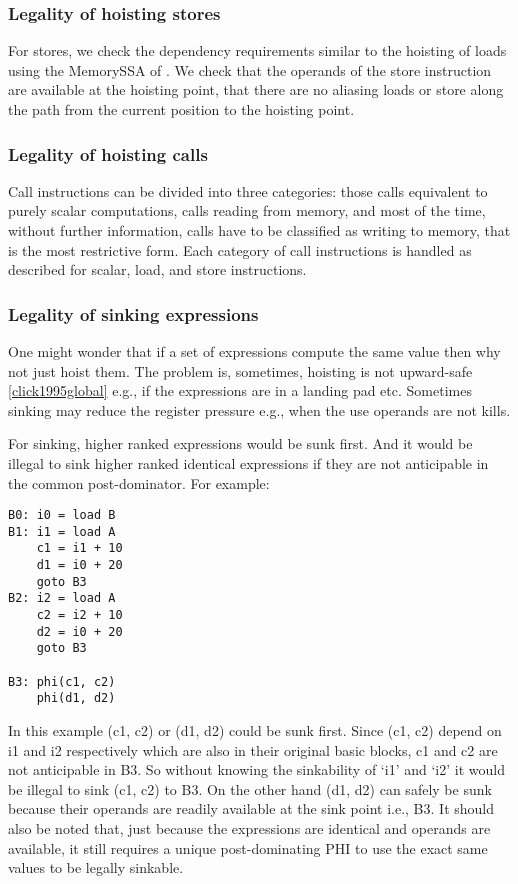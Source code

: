 \documentclass[acmlarge,review]{acmart}\settopmatter{printfolios=true}
\begin{document}
\subsubsection{Legality of hoisting stores}
For stores, we check the dependency requirements similar to the hoisting of
loads using the MemorySSA of \LLVM{}. We check that the operands of the store
instruction are available at the hoisting point, that there are no aliasing
loads or store along the path from the current position to the hoisting point.

\subsubsection{Legality of hoisting calls}
Call instructions can be divided into three categories: those calls equivalent
to purely scalar computations, calls reading from memory, and most of the time,
without further information, calls have to be classified as writing to memory,
that is the most restrictive form.  Each category of call instructions is
handled as described for scalar, load, and store instructions.

\subsubsection{Legality of sinking expressions}
One might wonder that if a set of expressions compute the same value then why
not just hoist them. The problem is, sometimes, hoisting is not upward-safe
\ref{click1995global} e.g., if the expressions are in a landing pad
etc. Sometimes sinking may reduce the register pressure e.g., when the use
operands are not kills.

For sinking, higher ranked expressions would be sunk first. And it would be
illegal to sink higher ranked identical expressions if they are not anticipable
in the common post-dominator. For example:

\begin{verbatim}
B0: i0 = load B
B1: i1 = load A
    c1 = i1 + 10
    d1 = i0 + 20
    goto B3
B2: i2 = load A
    c2 = i2 + 10
    d2 = i0 + 20
    goto B3

B3: phi(c1, c2)
    phi(d1, d2)
\end{verbatim}

In this example (c1, c2) or (d1, d2) could be sunk first. Since (c1, c2) depend
on i1 and i2 respectively which are also in their original basic blocks, c1 and
c2 are not anticipable in B3. So without knowing the sinkability of `i1' and
`i2' it would be illegal to sink (c1, c2) to B3. On the other hand (d1, d2) can
safely be sunk because their operands are readily available at the sink point
i.e., B3. It should also be noted that, just because the expressions are
identical and operands are available, it still requires a unique post-dominating
PHI to use the exact same values to be legally sinkable.
\end{document}
